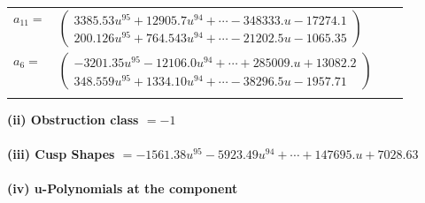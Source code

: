 \documentclass[1p]{elsarticle_modified}
\theoremstyle{definition}
\begin{document}
\begin{tabular}{m{7pt} m{180pt} m{7pt} m{180pt} }
\flushright $a_{11}=$&$\begin{pmatrix}3385.53 u^{95}+12905.7 u^{94}+\cdots-348333. u-17274.1\\200.126 u^{95}+764.543 u^{94}+\cdots-21202.5 u-1065.35\end{pmatrix}$ \\
\flushright $a_{6}=$&$\begin{pmatrix}-3201.35 u^{95}-12106.0 u^{94}+\cdots+285009. u+13082.2\\348.559 u^{95}+1334.10 u^{94}+\cdots-38296.5 u-1957.71\end{pmatrix}$\\&\end{tabular}
\flushleft \textbf{(ii) Obstruction class $= -1$}\\~\\
\flushleft \textbf{(iii) Cusp Shapes $= -1561.38 u^{95}-5923.49 u^{94}+\cdots+147695. u+7028.63$}\\~\\
\newpage\renewcommand{\arraystretch}{1}
\flushleft \textbf{(iv) u-Polynomials at the component}\newline \\
\end{document}

